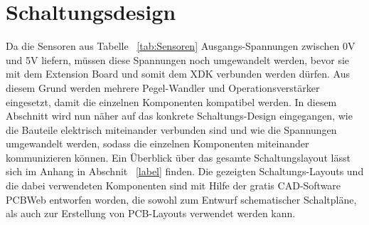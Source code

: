 \section{Schaltungsdesign}\label{sec:Schaltungsdesign}
Da die Sensoren aus Tabelle ~\ref{tab:Sensoren} Ausgangs-Spannungen zwischen 0V und 5V liefern, müssen diese Spannungen noch umgewandelt werden, bevor sie mit dem Extension Board und somit dem XDK verbunden werden dürfen. Aus diesem Grund werden mehrere Pegel-Wandler und Operationsverstärker eingesetzt, damit die einzelnen Komponenten kompatibel werden.
\newline
In diesem Abschnitt wird nun näher auf das konkrete Schaltungs-Design eingegangen, wie die Bauteile elektrisch miteinander verbunden sind und wie die Spannungen umgewandelt werden, sodass die einzelnen Komponenten miteinander kommunizieren können. Ein Überblick über das gesamte Schaltungslayout lässt sich im Anhang in Abschnit ~\ref{label} finden.
\newline
Die gezeigten Schaltungs-Layouts und die dabei verwendeten Komponenten sind mit Hilfe der gratis \acf{CAD}-Software PCBWeb entworfen worden, die sowohl zum Entwurf schematischer Schaltpläne, als auch zur Erstellung von \acf{PCB}-Layouts verwendet werden kann.
